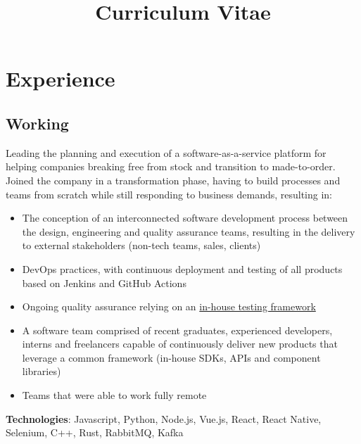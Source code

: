 \documentclass[11pt,a4paper]{moderncv}
\title{Curriculum Vitae}
\begin{document}
\maketitle

\vspace{-10mm}

\section{Experience}
\vspace{-2mm}
\subsection{Working}
{Leading the planning and execution of a software-as-a-service platform for helping companies breaking free from stock and transition to made-to-order. Joined the company in a transformation phase, having to build processes and teams from scratch while still responding to business demands, resulting in:
\begin{itemize}
  \item The conception of an interconnected software development process between the design, engineering and quality assurance teams, resulting in the delivery to external stakeholders (non-tech teams, sales, clients)
  \item DevOps practices, with continuous deployment and testing of all products based on Jenkins and GitHub Actions
  \item Ongoing quality assurance relying on an \href{https://github.com/ripe-tech/ripe-rainbow/}{in-house testing framework}
  \item A software team comprised of recent graduates, experienced developers, interns and freelancers capable of continuously deliver new products that leverage a common framework (in-house SDKs, APIs and component libraries)
  \item Teams that were able to work fully remote
\end{itemize}
\textbf{Technologies}: Javascript, Python, Node.js, Vue.js, React, React Native, Selenium, C++, Rust, RabbitMQ, Kafka}
\end{document}
